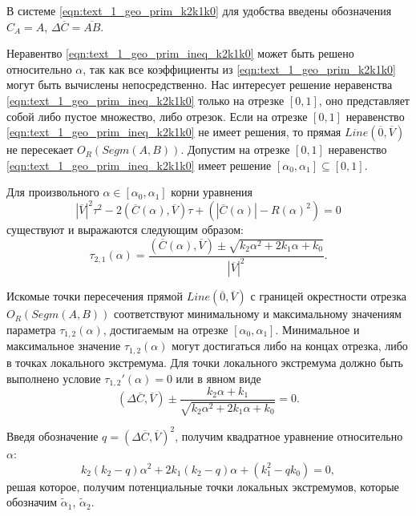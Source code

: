 В системе \eqref{eqn:text_1_geo_prim_k2k1k0} для удобства введены обозначения $C_A = A$, $\Delta \overline{C} = \overline{AB}$.

Неравентво \eqref{eqn:text_1_geo_prim_ineq_k2k1k0} может быть решено относительно $\alpha$, так как все коэффициенты из \eqref{eqn:text_1_geo_prim_k2k1k0} могут быть вычислены непосредственно.
Нас интересует решение неравенства \eqref{eqn:text_1_geo_prim_ineq_k2k1k0} только на отрезке $[0,1]$, оно представляет собой либо пустое множество, либо отрезок.
Если на отрезке $[0,1]$ неравенство \eqref{eqn:text_1_geo_prim_ineq_k2k1k0} не имеет решения, то прямая $Line(\overline{0}, \overline{V})$ не пересекает $O_R(Segm(A, B))$.
Допустим на отрезке $[0,1]$ неравенство \eqref{eqn:text_1_geo_prim_ineq_k2k1k0} имеет решение $[\alpha_0, \alpha_1] \subseteq [0, 1]$.
 
Для произвольного $\alpha \in [\alpha_0, \alpha_1]$ корни уравнения
\begin{equation}
	|\overline{V}|^2 \tau^2 - 2(\overline{C}(\alpha), \overline{V}) \tau + \left( |\overline{C}(\alpha)| - R(\alpha)^2 \right) = 0
\end{equation}
существуют и выражаются следующим образом:
\begin{equation}
	\tau_{2,1}(\alpha) = \frac{(\overline{C}(\alpha), \overline{V}) \pm \sqrt{k_2 \alpha^2 + 2 k_1 \alpha + k_0}}{|\overline{V}|^2}.
\end{equation}

Искомые точки пересечения прямой $Line(\overline{0}, \overline{V})$ с границей окрестности отрезка $O_R(Segm(A, B))$ соответствуют минимальному и максимальному значениям параметра $\tau_{1,2}(\alpha)$, достигаемым на отрезке $[\alpha_0, \alpha_1]$.
Минимальное и максимальное значение $\tau_{1,2}(\alpha)$ могут достигаться либо на концах отрезка, либо в точках локального экстремума.
Для точки локального экстремума должно быть выполнено условие $\tau_{1,2}'(\alpha) = 0$ или в явном виде
\begin{equation}
	(\Delta \overline{C}, \overline{V}) \pm \frac{k_2 \alpha + k_1}{ \sqrt{k_2 \alpha^2 + 2 k_1 \alpha + k_0} } = 0.
\end{equation}

Введя обозначение $q = (\Delta \overline{C}, \overline{V})^2$, получим квадратное уравнение относительно $\alpha$:
\begin{equation}
	k_2 (k_2 - q) \alpha^2 + 2 k_1 (k_2 - q) \alpha + (k_1^2 - q k_0) = 0,
\end{equation}
решая которое, получим потенциальные точки локальных экстремумов, которые обозначим $\tilde{\alpha}_1$, $\tilde{\alpha}_2$.

